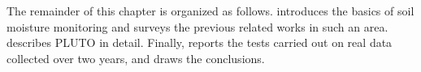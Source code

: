 
The remainder of this chapter is organized as follows.  introduces the basics of soil moisture monitoring and surveys the previous related works in such an area.
 describes PLUTO in detail. Finally,  reports the tests carried out on real data collected over two years, and  draws the conclusions.


